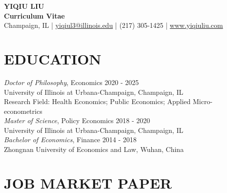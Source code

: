 \documentclass[a4paper,9pt]{extarticle}
\begin{document}
\pagestyle{empty}

\begin{center}
\textbf{\Large YIQIU LIU }\\[3pt] %
\textbf{Curriculum Vitae}\\[1pt] %
Champaign, IL | \href{mailto:yiqiul3@illinois.edu}{yiqiul3@illinois.edu} | (217) 305-1425 | \href{www.yiqiuliu.com}{www.yiqiuliu.com} %
\end{center}


\section*{EDUCATION}

\noindent
{\sl Doctor of Philosophy}, 
Economics \hfill  2020 - 2025 \\ 
University of Illinois at Urbana-Champaign, Champaign, IL \\ 
Research Field: Health Economics; Public Economics; Applied Micro-econometrics
\\

\noindent
{\sl Master of Science}, 
Policy Economics \hfill  2018 - 2020  \\ 
University of Illinois at Urbana-Champaign, Champaign, IL \\ 

\noindent
{\sl Bachelor of Economics}, 
Finance \hfill  2014 - 2018 \\ 
Zhongnan University of Economics and Law, Wuhan, China  \\ 

\section*{JOB MARKET PAPER}
\end{document}
